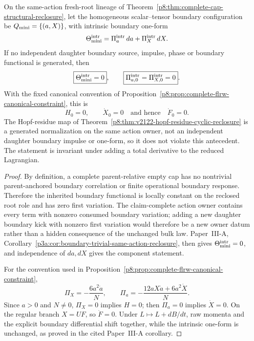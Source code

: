 \documentclass[12pt,a4paper]{article}
\begin{document}
\begin{theorem}
\label{p8:thm:complete-cap-zero-cotangent}
On the same-action fresh-root lineage of
Theorem~\ref{p8:thm:complete-cap-structural-reclosure}, let the homogeneous
scalar--tensor boundary configuration be \(Q_{\rm mini}=\{(a,X)\}\), with
intrinsic boundary one-form
\[
 \Theta_{\rm mini}^{\rm intr}
 =\Pi_a^{\rm intr}\,da+\Pi_X^{\rm intr}\,dX.
\]
If no independent daughter boundary source, impulse, phase or boundary
functional is generated, then
\begin{equation}
\label{p8:eq:complete-cap-zero-cotangent}
 \boxed{\Theta_{\rm mini}^{\rm intr}=0},
 \qquad
 \boxed{\Pi_{a,0}^{\rm intr}=\Pi_{X,0}^{\rm intr}=0}.
\end{equation}
With the fixed canonical convention of
Proposition~\ref{p8:prop:complete-flrw-canonical-constraint}, this is
\begin{equation}
\label{p8:eq:complete-cap-zero-tangent}
 \boxed{H_0=0,\qquad \dot X_0=0}
 \quad\text{and hence}\quad
 \boxed{\dot F_0=0}.
\end{equation}
The Hopf-residue map of Theorem~\ref{p8:thm:v2122-hopf-residue-cyclic-reclosure} is a generated normalization on the same action owner, not an independent daughter boundary impulse or one-form, so it does not violate this antecedent.
The statement is invariant under adding a total derivative to the reduced
Lagrangian.
\end{theorem}

\begin{proof}
By definition, a complete parent-relative empty cap has no nontrivial
parent-anchored boundary correlation or finite operational boundary response.
Therefore the inherited boundary functional is locally constant on the
reclosed root role and has zero first variation.  The claim-complete action
owner contains every term with nonzero consumed boundary variation; adding a
new daughter boundary kick with nonzero first variation would therefore be a
new owner datum rather than a hidden consequence of the unchanged bulk
law.  Paper~III-A,
Corollary~\ref{p3a:cor:boundary-trivial-same-action-reclosure}, then gives
\(\Theta_{\rm mini}^{\rm intr}=0\), and independence of \(da,dX\) gives the
component statement.

For the convention used in
Proposition~\ref{p8:prop:complete-flrw-canonical-constraint},
\[
 \Pi_X=-\frac{6a^2\dot a}{N},\qquad
 \Pi_a=-\frac{12aX\dot a+6a^2\dot X}{N}.
\]
Since \(a>0\) and \(N\ne0\), \(\Pi_X=0\) implies \(H=0\); then
\(\Pi_a=0\) implies \(\dot X=0\).  On the regular branch \(X=UF\), so
\(\dot F=0\).  Under \(L\mapsto L+dB/dt\), raw momenta and the explicit
boundary differential shift together, while the intrinsic one-form is
unchanged, as proved in the cited Paper~III-A corollary.
\end{proof}
\end{document}
